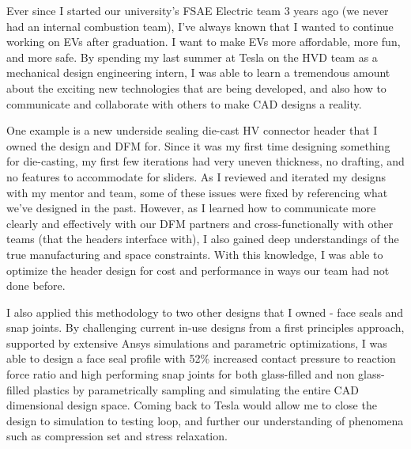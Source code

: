 \documentclass[11pt, letterpaper]{awesome-cv} %
\begin{document}
\makecvheader %

\makelettertitle %


\begin{cvletter}

Ever since I started our university's FSAE Electric team 3 years ago (we never had an internal combustion team), I've always known that I wanted to continue working on EVs after graduation. I want to make EVs more affordable, more fun, and more safe. By spending my last summer at Tesla on the HVD team as a mechanical design engineering intern, I was able to learn a tremendous amount about the exciting new technologies that are being developed, and also how to communicate and collaborate with others to make CAD designs a reality. 

One example is a new underside sealing die-cast HV connector header that I owned the design and DFM for. Since it was my first time designing something for die-casting, my first few iterations had very uneven thickness, no drafting, and no features to accommodate for sliders. As I reviewed and iterated my designs with my mentor and team, some of these issues were fixed by referencing what we've designed in the past. However, as I learned how to communicate more clearly and effectively with our DFM partners and cross-functionally with other teams (that the headers interface with), I also gained deep understandings of the true manufacturing and space constraints. With this knowledge, I was able to optimize the header design for cost and performance in ways our team had not done before.

I also applied this methodology to two other designs that I owned - face seals and snap joints. By challenging current in-use designs from a first principles approach, supported by extensive Ansys simulations and parametric optimizations, I was able to design a face seal profile with 52\% increased contact pressure to reaction force ratio and high performing snap joints for both glass-filled and non glass-filled plastics by parametrically sampling and simulating the entire CAD dimensional design space. Coming back to Tesla would allow me to close the design to simulation to testing loop, and further our understanding of phenomena such as compression set and stress relaxation.


\end{cvletter}
\end{document}
